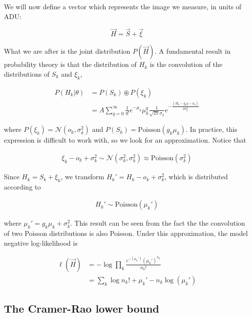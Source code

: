 \documentclass{ucetd}
\begin{document}
We will now define a vector which represents the image we measure, in units of ADU: 

\begin{equation}
\vec{H} = \vec{S} + \vec{\xi}
\end{equation}

What we are after is the joint distribution $P(\vec{H})$. A fundamental result in probability theory is that the distribution of $H_{k}$ is the convolution of the distributions of $S_{k}$ and $\xi_{k}$,

\begin{align}
P(H_{k}|\theta) &= P(S_{k})\circledast P(\xi_{k})\\
&= A\sum_{q=0}^{\infty} \frac{1}{q!}e^{-\mu_{k}}\mu_{k}^{q}\frac{1}{\sqrt{2\pi}\sigma_{k}}e^{-\frac{(H_{k}-g_{k}q-o_{k})}{2\sigma_{k}^{2}}}
\end{align}

where $P(\xi_{k}) = \mathcal{N}(o_{k},\sigma_{k}^{2})$ and $P(S_{k}) = \mathrm{Poisson}(g_{k}\mu_{k})$. In practice, this expression is difficult to work with, so we look for an approximation. Notice that 

\begin{align*}
\xi_{k} - o_{k} + \sigma_{k}^{2} \sim \mathcal{N}(\sigma_{k}^{2},\sigma_{k}^{2}) \approx \mathrm{Poisson}(\sigma_{k}^{2})
\end{align*}

Since $H_{k} = S_{k} + \xi_{k}$, we transform $H_{k}' = H_{k} - o_{k} + \sigma_{k}^{2}$, which is distributed according to 

\begin{align*}
H_{k}' \sim \mathrm{Poisson}(\mu_{k}')
\end{align*}

where $\mu_{k}' = g_{k}\mu_{k} + \sigma_{k}^{2}$. This result can be seen from the fact the the convolution of two Poisson distributions is also Poisson. Under this approximation, the model negative log-likelihood is

\begin{align*}
\ell(\vec{H}) &= -\log \prod_{k} \frac{e^{-\left(\mu_{k}'\right)}\left(\mu_{k}'\right)^{n_{k}}}{n_{k}!}\\
&= \sum_{k}  \log n_{k}! + \mu_{k}' - n_{k}\log\left(\mu_{k}'\right)
\end{align*}


\subsection{The Cramer-Rao lower bound}
\end{document}

